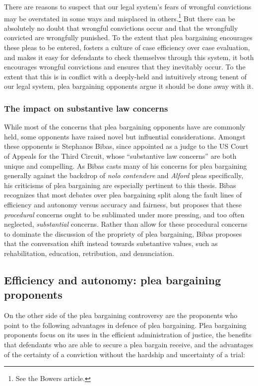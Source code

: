 There are reasons to suspect that our legal system's fears of wrongful convictions may be overstated in some ways and misplaced in others.\footnote{See the Bowers article.} But there can be absolutely no doubt that wrongful convictions occur and that the wrongfully convicted are wrongfully punished. To the extent that plea bargaining encourages these pleas to be entered, fosters a culture of case efficiency over case evaluation, and makes it easy for defendants to check themselves through this system, it both encourages wrongful convictions and ensures that they inevitably occur. To the extent that this is in conflict with a deeply-held and intuitively strong tenent of our legal system, plea bargaining opponents argue it should be done away with it.

\subsubsection{The impact on substantive law concerns}

While most of the concerns that plea bargaining opponents have are commonly held, some opponents have raised novel but influential considerations. Amongst these opponents is Stephanos Bibas, since appointed as a judge to the US Court of Appeals for the Third Circuit, whose ``substantive law concerns'' are both unique and compelling. As Bibas casts many of his concerns for plea bargaining generally against the backdrop of \textit{nolo contendere} and \textit{Alford} pleas specifically, his criticisms of plea bargaining are especially pertinent to this thesis. Bibas recognizes that most debates over plea bargaining split along the fault lines of efficiency and autonomy versus accuracy and fairness, but proposes that these \textit{procedural} concerns ought to be sublimated under more pressing, and too often neglected, \textit{substantial} concerns. Rather than allow for these procedural concerns to dominate the discussion of the propriety of plea bargaining, Bibas proposes that the conversation shift instead towards substantive values, such as rehabilitation, education, retribution, and denunciation.

\subsection{Efficiency and autonomy: plea bargaining proponents}

On the other side of the plea bargaining controversy are the proponents who point to the following advantages in defence of plea bargaining. Plea bargaining proponents focus on its uses in the efficient administration of justice, the benefits that defendants who are able to secure a plea bargain receive, and the advantages of the certainty of a conviction without the hardship and uncertainty of a trial:

